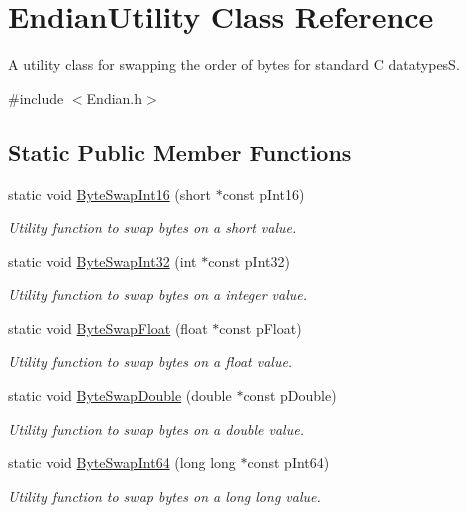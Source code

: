 \hypertarget{class_endian_utility}{
\section{EndianUtility Class Reference}
\label{class_endian_utility}
}


A utility class for swapping the order of bytes for standard C datatypesS.  




{\ttfamily \#include $<$Endian.h$>$}

\subsection*{Static Public Member Functions}
\begin{DoxyCompactItemize}
\item 
static void \hyperlink{class_endian_utility_ab6acdec6461522e56f87b51602f8642e}{ByteSwapInt16} (short $\ast$const pInt16)
\begin{DoxyCompactList}\small\item\em Utility function to swap bytes on a short value. \end{DoxyCompactList}\item 
static void \hyperlink{class_endian_utility_a0c25a3c75289d5c09cfd1d1f467996f9}{ByteSwapInt32} (int $\ast$const pInt32)
\begin{DoxyCompactList}\small\item\em Utility function to swap bytes on a integer value. \end{DoxyCompactList}\item 
static void \hyperlink{class_endian_utility_a26127408f9dd0cac978d49c49aefa570}{ByteSwapFloat} (float $\ast$const pFloat)
\begin{DoxyCompactList}\small\item\em Utility function to swap bytes on a float value. \end{DoxyCompactList}\item 
static void \hyperlink{class_endian_utility_a85cbdf3849b1f5ef182b1b388ff5b48d}{ByteSwapDouble} (double $\ast$const pDouble)
\begin{DoxyCompactList}\small\item\em Utility function to swap bytes on a double value. \end{DoxyCompactList}\item 
static void \hyperlink{class_endian_utility_aa475e550bccb2cbb333f7e48b5f4396b}{ByteSwapInt64} (long long $\ast$const pInt64)
\begin{DoxyCompactList}\small\item\em Utility function to swap bytes on a long long value. \end{DoxyCompactList}\end{DoxyCompactItemize}


